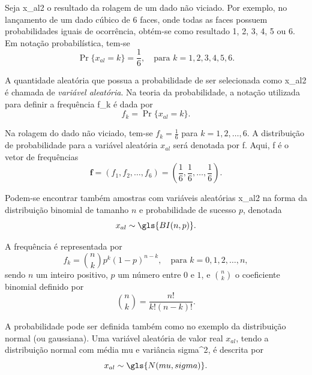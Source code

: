 Seja \gls{x_al2} o resultado da rolagem de um dado não viciado. Por exemplo, no lançamento de um dado cúbico de 6 faces, onde todas as faces possuem probabilidades iguais de ocorrência, obtém-se como resultado 1, 2, 3, 4, 5 ou 6. Em notação probabilística, tem-se
\begin{equation}
    \Pr\{x_{al} = k\} = \frac{1}{6}, \quad \text{para } k = 1, 2, 3, 4, 5, 6.
\end{equation}

A quantidade aleatória que possua a probabilidade de ser selecionada como \gls{x_al2} é chamada de \textit{variável aleatória}. Na teoria da probabilidade, a notação utilizada para definir a frequência \gls{f_k} é dada por
\begin{equation}
    f_k = \Pr\{x_{al} = k\}.
\end{equation}

Na rolagem do dado não viciado, tem-se $f_k = \frac{1}{6}$ para $k = 1, 2, \ldots, 6$. A distribuição de probabilidade para a variável aleatória $x_{al}$ será denotada por \gls{f}. Aqui, \gls{f} é o vetor de frequências
\begin{equation}
    \mathbf{f} = (f_1, f_2, \ldots, f_6) = \left(\frac{1}{6}, \frac{1}{6}, \ldots, \frac{1}{6}\right).
\end{equation}

Podem-se encontrar também amostras com variáveis aleatórias \gls{x_al2} na forma da distribuição binomial de tamanho $n$ e probabilidade de sucesso $p$, denotada
\begin{equation}
    x_{al} \sim \gls{BI(n,p)}.
\end{equation}

A frequência é representada por
\begin{equation}
    f_k = \binom{n}{k} p^k (1-p)^{n-k}, \quad \text{para } k = 0, 1, 2, \ldots, n,
\end{equation}
sendo $n$ um inteiro positivo, $p$ um número entre $0$ e $1$, e $\binom{n}{k}$ o coeficiente binomial definido por
\begin{equation}
    \binom{n}{k} = \frac{n!}{k!(n - k)!}.
\end{equation}

A probabilidade pode ser definida também como no exemplo da distribuição normal (ou gaussiana). Uma variável aleatória de valor real $x_{al}$, tendo a distribuição normal com média \gls{mu} e variância \gls{sigma^2}, é descrita por
\begin{equation}
    x_{al} \sim \gls{N(mu,sigma)}.
\end{equation}

